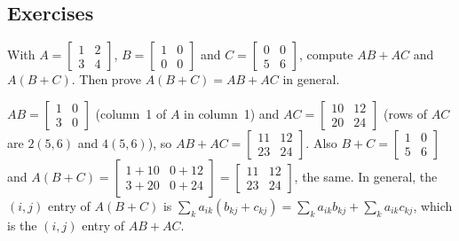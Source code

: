 \subsection{Exercises}

\begin{exercise}\label{ex:u04-distributive}
With $A=\begin{bmatrix} 1&2\\ 3&4\end{bmatrix}$, $B=\begin{bmatrix} 1&0\\ 0&0\end{bmatrix}$
and $C=\begin{bmatrix} 0&0\\ 5&6\end{bmatrix}$, compute $AB+AC$ and $A(B+C)$. Then prove
$A(B+C)=AB+AC$ in general.
\end{exercise}
\begin{solution}
$AB=\begin{bmatrix} 1&0\\ 3&0\end{bmatrix}$ (column~1 of $A$ in column~1) and
$AC=\begin{bmatrix} 10&12\\ 20&24\end{bmatrix}$ (rows of $AC$ are $2(5,6)$ and $4(5,6)$), so
$AB+AC=\begin{bmatrix} 11&12\\ 23&24\end{bmatrix}$. Also
$B+C=\begin{bmatrix} 1&0\\ 5&6\end{bmatrix}$ and
$A(B+C)=\begin{bmatrix} 1+10&0+12\\ 3+20&0+24\end{bmatrix}=\begin{bmatrix} 11&12\\ 23&24\end{bmatrix}$,
the same. In general, the $(i,j)$ entry of $A(B+C)$ is
$\sum_k a_{ik}(b_{kj}+c_{kj})=\sum_k a_{ik}b_{kj}+\sum_k a_{ik}c_{kj}$, which is the $(i,j)$
entry of $AB+AC$.
\end{solution}

